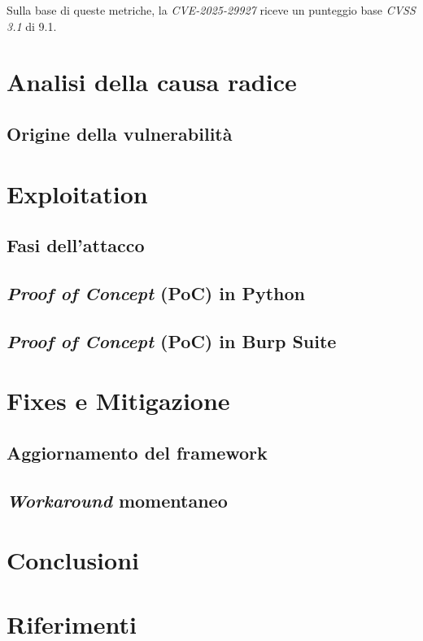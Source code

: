 \documentclass[a4paper,oneside,12pt]{report}
\begin{document}
Sulla base di queste metriche, la \emph{CVE-2025-29927} riceve un punteggio base \emph{CVSS 3.1} di 9.1.

\chapter{Analisi della causa radice}
\label{chap:analisi-causa-radice}


\section{Origine della vulnerabilit\`a}
\label{sec:origine-vulnerabilita}

\chapter{Exploitation}
\label{chap:exploitation}

\section{Fasi dell'attacco}
\label{sec:fasi-attacco}

\section{\textit{Proof of Concept} (PoC) in Python}
\label{sec:poc-python}

\section{\textit{Proof of Concept} (PoC) in Burp Suite}
\label{sec:poc-burp-suite}

\chapter{Fixes e Mitigazione}
\label{chap:fixes-mitigazione}

\section{Aggiornamento del framework}
\label{sec:aggiornamento-framework}

\section{\textit{Workaround} momentaneo}
\label{sec:workaround-momentaneo}

\chapter*{Conclusioni}
\label{chap:conclusioni}

\chapter*{Riferimenti}
\label{chap:references}
\end{document}
